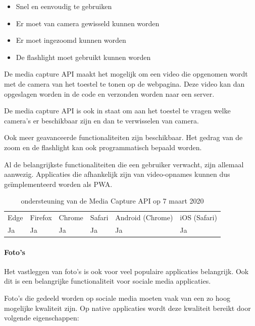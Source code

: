 	   \begin{itemize}
	     \item	Snel en eenvoudig te gebruiken
	     \item	Er moet van camera gewisseld kunnen worden
	     \item	Er moet ingezoomd kunnen worden
	     \item	De flashlight moet gebruikt kunnen worden
	   \end{itemize}
	
	De media capture API \autocite{DzungDTran2012}  maakt het mogelijk om een video die opgenomen wordt met de camera van het toestel te tonen op de webpagina. Deze video kan dan opgeslagen worden in de code en verzonden worden naar een server. 
	\autocite{Fransson2017}
	
	De media capture API is ook in staat om aan het toestel te vragen welke camera's er beschikbaar zijn en dan te verwisselen van camera.
	\autocite{Scales2020a}
	
	Ook meer geavanceerde functionaliteiten  zijn beschikbaar. Het gedrag van de zoom en de flashlight kan ook programmatisch bepaald worden.
	\autocite{Oberhofer2017} \autocite{Ogundipe2018}
	
	
	Al de belangrijkste functionaliteiten die een gebruiker verwacht, zijn allemaal aanwezig. Applicaties die afhankelijk zijn van video-opnames kunnen dus geïmplementeerd worden als PWA.
	
	\begin{table}[H]
		\centering
		\begin{tabular}{llllll}
			Edge & Firefox & Chrome & Safari & Android (Chrome) & iOS (Safari) \\
			Ja   & Ja      & Ja     & Ja     & Ja               & Ja          
		\end{tabular}	
		\caption{ondersteuning van de Media Capture API op 7 maart 2020}
	\end{table}
	
	
	
	\paragraph{Foto's }
	
	Het vastleggen van foto's is ook voor veel populaire applicaties belangrijk. Ook dit is een belangrijke functionaliteit voor sociale media applicaties.
	
	Foto's die gedeeld worden op sociale media moeten vaak van een zo hoog mogelijke kwaliteit zijn. Op native applicaties wordt deze kwaliteit bereikt door volgende eigenschappen: 
	
